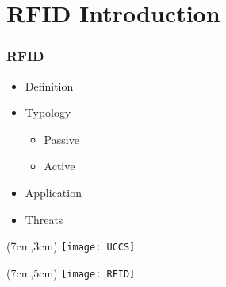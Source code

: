 \section{RFID Introduction}
\begin{frame}
  \frametitle{RFID}

  \begin{itemize}
   \item<1-> Definition
   \item<2-> Typology
   \begin{itemize}
    \item Passive
    \item Active
   \end{itemize}
   \item<3-> Application
   \item<4-> Threats
  \end{itemize}

 \begin{textblock*}{5cm}(7cm,3cm)
  \texttt{[image: UCCS]}
 \end{textblock*}

 \begin{textblock*}{5cm}(7cm,5cm)
  \texttt{[image: RFID]}
 \end{textblock*}


\end{frame}
